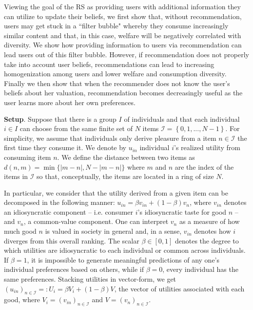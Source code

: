 \documentclass[sigconf]{acmart}
\begin{document}
Viewing the goal of the RS as providing users with additional information they can utilize to update their beliefs, we first show that, without recommendation, users may get stuck in a ``filter bubble" whereby they consume increasingly similar content and that, in this case, welfare will be negatively correlated with diversity. We show how providing information to users via recommendation can lead users out of this filter bubble. However, if recommendation does not properly take into account user beliefs, recommendations can lead to increasing homogenization among users and lower welfare and consumption diversity. Finally we then show that when the recommender does not know the user's beliefs about her valuation, recommendation becomes decreasingly useful as the user learns more about her own preferences.
\par
\noindent \textbf{Setup}. Suppose that there is a group $I$ of individuals and that each individual $i \in I$ can choose from the same finite set of $N$ items $\mathcal{I} = \left\{0,1,...,N-1\right\}$. For simplicity, we assume that individuals only derive pleasure from a item $n \in \mathcal{I}$ the first time they consume it. We denote by $u_{in}$ individual $i$'s realized utility from consuming item $n$. We define the distance between two items as $d(n,m)=\min\{ \lvert m - n \rvert ,N - \lvert m - n \rvert \}$ where $m$ and $n$ are the index of the items in $\mathcal{I}$ so that, conceptually, the items are located in a ring of size $N$.
\par
In particular, we consider that the utility derived from a given item can be decomposed in the following manner: $u_{in}=\beta v_{in} + (1-\beta) v_n$, where $v_{in}$ denotes an idiosyncratic component -- i.e. consumer $i$'s idiosyncratic taste for good $n$ --  and $v_{n}$, a common-value component. 
One can interpret $v_n$ as a measure of how much good $n$ is valued in society in general and, in a sense, $v_{in}$ denotes how $i$ diverges from this overall ranking. 
The scalar $\beta \in [0,1]$ denotes the degree to which utilities are idiosyncratic to each individual or common across individuals. If $\beta=1$, it is impossible to generate meaningful predictions of any one's individual preferences based on others, while if $\beta=0$, every individual has the same preferences.
Stacking utilities in vector-form, we get ${\left(u_{in}\right)}_{n \in \mathcal{I}}=:U_i=\beta V_i+(1 - \beta) V $, the vector of utilities associated with each good, where $V_i ={\left(v_{in}\right)}_{n \in \mathcal{I}}$ and $V={\left(v_{n}\right)}_{n \in \mathcal{I}}$.
\end{document}
